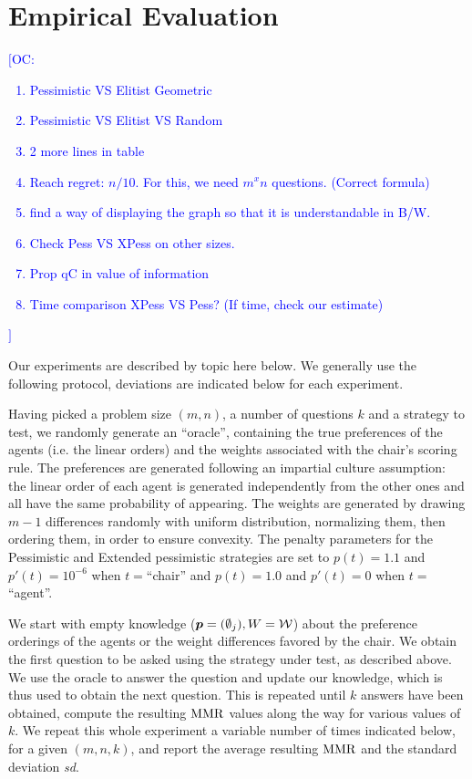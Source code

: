 \documentclass[sigconf, anonymous]{aamas}
\newcommand{\commentOC}[1]{\textcolor{blue}{\small$\big[$OC: #1$\big]$}}
\begin{document}
\section{Empirical Evaluation} 
\label{sec:experiments}
\commentOC{
	\begin{enumerate}
		\item Pessimistic VS Elitist Geometric
		\item Pessimistic VS Elitist VS Random
		\item 2 more lines in table
		\item Reach regret: $n/10$. For this, we need $m^x n$ questions. (Correct formula)
		\item find a way of displaying the graph so that it is understandable in B/W.
		\item Check Pess VS XPess on other sizes.
		\item Prop qC in value of information
		\item Time comparison XPess VS Pess? (If time, check our estimate)
	\end{enumerate}
}
Our experiments are described by topic here below. We generally use the following protocol, deviations are indicated below for each experiment.

Having picked a problem size $(m, n)$, a number of questions $k$ and a strategy to test, we randomly generate an “oracle”, containing the true preferences of the agents (i.e. the linear orders) and the weights associated with the chair's scoring rule. 
The preferences are generated following an impartial culture assumption: the linear order of each agent is generated independently from the other ones and all have the same probability of appearing. The weights are generated by drawing $m-1$ differences randomly with uniform distribution, normalizing them, then ordering them, in order to ensure convexity.
The penalty parameters for the Pessimistic and Extended pessimistic strategies are set to $p(t) = 1.1$ and $p'(t) = 10^{-6}$ when $t = $“chair” and $p(t) = 1.0$ and $p'(t) = 0$ when $t = $“agent”.

We start with empty knowledge (${\bm{p}} = (\emptyset_j), W = \mathcal{W}$) about the preference orderings of the agents or the weight differences favored by the chair. We obtain the first question to be asked using the strategy under test, as described above. We use the oracle to answer the question and update our knowledge, which is thus used to obtain the next question. This is repeated until $k$ answers have been obtained, compute the resulting $\operatorname{MMR}$ values along the way for various values of $k$. We repeat this whole experiment a variable number of times indicated below, for a given $(m, n, k)$, and report the average resulting $\operatorname{MMR}$ and the standard deviation \textit{sd}.
\end{document}

